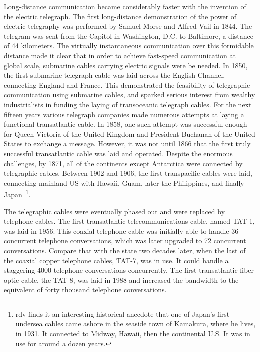 Long-distance communication became considerably faster with the invention of the electric telegraph.
The first long-distance demonstration of the power of electric telegraphy was performed by Samuel Morse and Alfred Vail in 1844.
The telegram was sent from the Capitol in Washington, D.C. to Baltimore, a distance of 44 kilometers.
The virtually instantaneous communication over this formidable distance made it clear that in order to achieve fast-speed communication at global scale, submarine cables carrying electric signals were be needed.
In 1850, the first submarine telegraph cable was laid across the English Channel, connecting England and France.
This demonstrated the feasibility of telegraphic communication using submarine cables, and sparked serious interest from wealthy industrialists in funding the laying of transoceanic telegraph cables.
For the next fifteen years various telegraph companies made numerous attempts at laying a functional transatlantic cable.
In 1858, one such attempt was successful enough for Queen Victoria of the United Kingdom and President Buchanan of the United States to exchange a message. 
However, it was not until 1866 that the first truly successful transatlantic cable was laid and operated.
Despite the enormous challenges, by 1871, all of the continents except Antarctica were connected by telegraphic cables.
Between 1902 and 1906, the first transpacific cables were laid, connecting mainland US with Hawaii, Guam, later the Philippines, and finally Japan~\footnote{rdv finds it an interesting historical anecdote that one of Japan's first undersea cables came ashore in the seaside town of Kamakura, where he lives, in 1931.  It connected to Midway, Hawaii, then the continental U.S. It was in use for around a dozen years.}.

The telegraphic cables were eventually phased out and were replaced by telephone cables.
The first transatlantic telecommunications cable, named TAT-1, was laid in 1956.
This coaxial telephone cable was initially able to handle 36 concurrent telephone conversations, which was later upgraded to 72 concurrent conversations. 
Compare that with the state two decades later, when the last of the coaxial copper telephone cables, TAT-7, was in use.
It could handle a staggering 4000 telephone conversations concurrently.
The first transatlantic fiber optic cable, the TAT-8, was laid in 1988 and increased the bandwidth to the equivalent of forty thousand telephone conversations.

